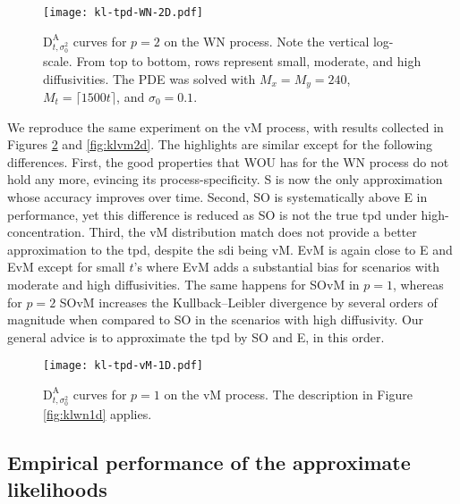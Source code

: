 \documentclass[oneside,11pt]{article}
\begin{document}
\begin{figure}[!h]
	\vspace*{-0.25cm}
	\centering
	\texttt{[image: kl-tpd-WN-2D.pdf]}
	\vspace*{-0.5cm}
	\caption{\small $\mathrm{D}^\mathrm{A}_{t,\sigma_0^2}$ curves for $p=2$ on the WN process. Note the vertical log-scale. From top to bottom, rows represent small, moderate, and high diffusivities. The PDE was solved with $M_x=M_y=240$, $M_t=\lceil 1500t\rceil$, and $\sigma_0=0.1$.}
	\label{fig:klwn2d}
\end{figure}

We reproduce the same experiment on the vM process, with results collected in Figures \ref{fig:klvm1d} and \ref{fig:klvm2d}. The highlights are similar except for the following  differences. First, the good properties that WOU has for the WN process do not hold any more, evincing its process-specificity. S is now the only approximation whose accuracy improves over time. Second, SO is systematically above E in performance, yet this difference is reduced as SO is not the true tpd under high-concentration. Third, the vM distribution match does not provide a better approximation to the tpd, despite the sdi being vM. EvM is again close to E and EvM except for small $t$'s where EvM adds a substantial bias for scenarios with moderate and high diffusivities. The same happens for SOvM in $p=1$, whereas for $p=2$ SOvM increases the Kullback--Leibler divergence by several orders of magnitude when compared to SO in the scenarios with high diffusivity. Our general advice is to approximate the tpd by SO and E, in this order.

\begin{figure}[!h]
	\vspace*{-0.25cm}
	\centering
	\texttt{[image: kl-tpd-vM-1D.pdf]}
	\vspace*{-0.5cm}
	\caption{\small $\mathrm{D}^\mathrm{A}_{t,\sigma_0^2}$ curves for $p=1$ on the vM process. The description in Figure \ref{fig:klwn1d} applies.}
	\label{fig:klvm1d}
\end{figure}

\subsection{Empirical performance of the approximate likelihoods}
\end{document}
